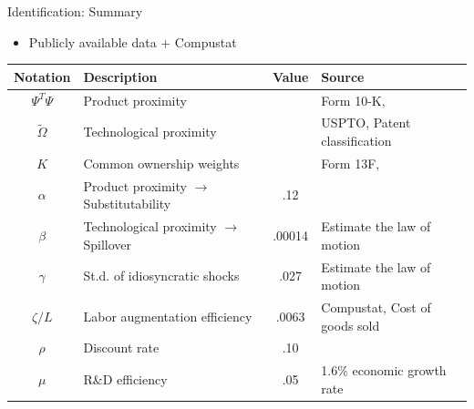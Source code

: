\documentclass[english,aspectratio=169,handout]{beamer}
\theoremstyle{plain}
\begin{document}
%
\begin{frame}{Identification: Summary}
  \begin{itemize}
    \item Publicly available data $+$ Compustat
  \end{itemize}
  \begin{center}
    \begin{tabular}{clcl}
      Notation                            & Description                                      & Value  & Source\tabularnewline
      \hline
      $\Psi^{T}\Psi$                      & Product proximity                                &        & Form 10-K, \citet{Hoberg2016-jm}\tabularnewline
      {\footnotesize$\widetilde{\Omega}$} & Technological proximity                          &        & USPTO, Patent classification\tabularnewline
      $K$                                 & Common ownership weights                         &        & Form 13F, \citet{Backus2021-yt}\tabularnewline
      $\alpha$                            & Product proximity $\rightarrow$ Substitutability & .12    & \citet{Pellegrino2024-dn}\tabularnewline
      $\beta$                             & Technological proximity $\rightarrow$ Spillover  & .00014 & Estimate the law of motion\tabularnewline
      $\gamma$                            & St.d. of idiosyncratic shocks                    & .027   & Estimate the law of motion\tabularnewline
      $\zeta/L$                           & Labor augmentation efficiency                    & .0063  & Compustat, Cost of goods sold\tabularnewline
      $\rho$                              & Discount rate                                    & .10    & \tabularnewline
      $\mu$                               & R\&D efficiency                                  & .05    & 1.6\% economic growth rate\tabularnewline
    \end{tabular}
    \par\end{center}

\end{frame}
%
\end{document}
